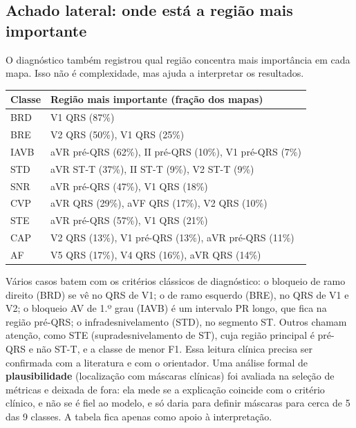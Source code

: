 \documentclass[11pt,a4paper]{article}
\begin{document}
\subsection{Achado lateral: onde está a região mais importante}
O diagnóstico também registrou qual região concentra mais importância em cada mapa. Isso não é complexidade, mas ajuda a interpretar os resultados.
\begin{center}\small
\begin{tabularx}{\linewidth}{lX}
\toprule
\textbf{Classe} & \textbf{Região mais importante (fração dos mapas)} \\
\midrule
BRD  & V1 QRS (87\%) \\
BRE  & V2 QRS (50\%), V1 QRS (25\%) \\
IAVB & aVR pré-QRS (62\%), II pré-QRS (10\%), V1 pré-QRS (7\%) \\
STD  & aVR ST-T (37\%), II ST-T (9\%), V2 ST-T (9\%) \\
SNR  & aVR pré-QRS (47\%), V1 QRS (18\%) \\
CVP  & aVR QRS (29\%), aVF QRS (17\%), V2 QRS (10\%) \\
STE  & aVR pré-QRS (57\%), V1 QRS (21\%) \\
CAP  & V2 QRS (13\%), V1 pré-QRS (13\%), aVR pré-QRS (11\%) \\
AF   & V5 QRS (17\%), V4 QRS (16\%), aVR QRS (14\%) \\
\bottomrule
\end{tabularx}
\end{center}
Vários casos batem com os critérios clássicos de diagnóstico: o bloqueio de ramo direito (BRD) se vê no QRS de V1; o de ramo esquerdo (BRE), no QRS de V1 e V2; o bloqueio AV de 1.º grau (IAVB) é um intervalo PR longo, que fica na região pré-QRS; o infradesnivelamento (STD), no segmento ST. Outros chamam atenção, como STE (supradesnivelamento de ST), cuja região principal é pré-QRS e não ST-T, e a classe de menor F1. Essa leitura clínica precisa ser confirmada com a literatura e com o orientador. Uma análise formal de \textbf{plausibilidade} (localização com máscaras clínicas) foi avaliada na seleção de métricas e deixada de fora: ela mede se a explicação coincide com o critério clínico, e não se é fiel ao modelo, e só daria para definir máscaras para cerca de 5 das 9 classes. A tabela fica apenas como apoio à interpretação.
\end{document}

